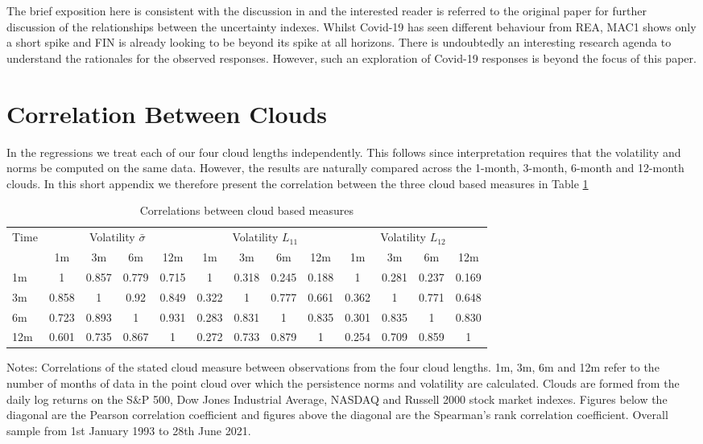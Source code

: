 \documentclass{article}
\begin{document}
The brief exposition here is consistent with the discussion in \cite{jurado2015measuring} and the interested reader is referred to the original paper for further discussion of the relationships between the uncertainty indexes. Whilst Covid-19 has seen different behaviour from REA, MAC1 shows only a short spike and FIN is already looking to be beyond its spike at all horizons. There is undoubtedly an interesting research agenda to understand the rationales for the observed responses. However, such an exploration of Covid-19 responses is beyond the focus of this paper.

\section{Correlation Between Clouds}

In the regressions we treat each of our four cloud lengths independently. This follows since interpretation requires that the volatility and norms be computed on the same data. However, the results are naturally compared across the 1-month, 3-month, 6-month and 12-month clouds. In this short appendix we therefore present the correlation between the three cloud based measures in Table \ref{tab:corcloud}

\begin{table}
    \begin{center}
        \caption{Correlations between cloud based measures}
        \label{tab:corcloud}
        \begin{tabular}{l c c c c c c c c c c c c}
        \hline
        Time & \multicolumn{4}{c}{Volatility $\bar{\sigma}$} & \multicolumn{4}{c}{Volatility $L_{11}$} & \multicolumn{4}{c}{Volatility $L_{12}$} \\
        & 1m & 3m & 6m & 12m & 1m & 3m & 6m & 12m & 1m & 3m & 6m & 12m\\
        \hline
         1m & 1&0.857&0.779&0.715&1&0.318&0.245&0.188&1&0.281&0.237&0.169\\
         3m & 0.858&1&0.92&0.849&0.322&1&0.777&0.661&0.362&1&0.771&0.648\\
         6m & 0.723&0.893&1&0.931&0.283&0.831&1&0.835&0.301&0.835&1&0.830\\
        12m & 0.601&0.735&0.867&1&0.272&0.733&0.879&1&0.254&0.709&0.859&1\\
        \hline
        \end{tabular}
    \end{center}
    \footnotesize{Notes: Correlations of the stated cloud measure between observations from the four cloud lengths. 1m, 3m, 6m and 12m refer to the number of months of data in the point cloud over which the persistence norms and volatility are calculated. Clouds are formed from the daily log returns on the S\&P 500, Dow Jones Industrial Average, NASDAQ and Russell 2000 stock market indexes. Figures below the diagonal are the Pearson correlation coefficient and figures above the diagonal are the Spearman's rank correlation coefficient. Overall sample from 1st January 1993 to 28th June 2021.}
\end{table}
\end{document}
